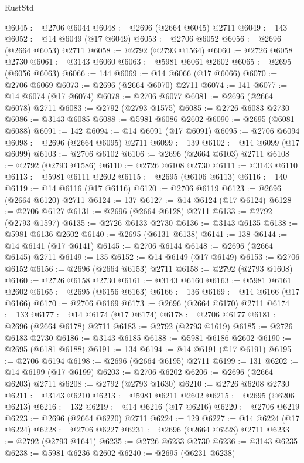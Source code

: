 \begin{lexlean}{RustStd}
\begin{coremodule}
@6045 := @2706 @6044
@6048 := @2696 (@2664 @6045) @2711
@6049 := 143
@6052 := @14 @6049 (@17 @6049)
@6053 := @2706 @6052
@6056 := @2696 (@2664 @6053) @2711
@6058 := @2792 (@2793 @1564)
@6060 := @2726 @6058 @2730
@6061 := @3143 @6060
@6063 := @5981 @6061 @2602
@6065 := @2695 (@6056 @6063)
@6066 := 144
@6069 := @14 @6066 (@17 @6066)
@6070 := @2706 @6069
@6073 := @2696 (@2664 @6070) @2711
@6074 := 141
@6077 := @14 @6074 (@17 @6074)
@6078 := @2706 @6077
@6081 := @2696 (@2664 @6078) @2711
@6083 := @2792 (@2793 @1575)
@6085 := @2726 @6083 @2730
@6086 := @3143 @6085
@6088 := @5981 @6086 @2602
@6090 := @2695 (@6081 @6088)
@6091 := 142
@6094 := @14 @6091 (@17 @6091)
@6095 := @2706 @6094
@6098 := @2696 (@2664 @6095) @2711
@6099 := 139
@6102 := @14 @6099 (@17 @6099)
@6103 := @2706 @6102
@6106 := @2696 (@2664 @6103) @2711
@6108 := @2792 (@2793 @1586)
@6110 := @2726 @6108 @2730
@6111 := @3143 @6110
@6113 := @5981 @6111 @2602
@6115 := @2695 (@6106 @6113)
@6116 := 140
@6119 := @14 @6116 (@17 @6116)
@6120 := @2706 @6119
@6123 := @2696 (@2664 @6120) @2711
@6124 := 137
@6127 := @14 @6124 (@17 @6124)
@6128 := @2706 @6127
@6131 := @2696 (@2664 @6128) @2711
@6133 := @2792 (@2793 @1597)
@6135 := @2726 @6133 @2730
@6136 := @3143 @6135
@6138 := @5981 @6136 @2602
@6140 := @2695 (@6131 @6138)
@6141 := 138
@6144 := @14 @6141 (@17 @6141)
@6145 := @2706 @6144
@6148 := @2696 (@2664 @6145) @2711
@6149 := 135
@6152 := @14 @6149 (@17 @6149)
@6153 := @2706 @6152
@6156 := @2696 (@2664 @6153) @2711
@6158 := @2792 (@2793 @1608)
@6160 := @2726 @6158 @2730
@6161 := @3143 @6160
@6163 := @5981 @6161 @2602
@6165 := @2695 (@6156 @6163)
@6166 := 136
@6169 := @14 @6166 (@17 @6166)
@6170 := @2706 @6169
@6173 := @2696 (@2664 @6170) @2711
@6174 := 133
@6177 := @14 @6174 (@17 @6174)
@6178 := @2706 @6177
@6181 := @2696 (@2664 @6178) @2711
@6183 := @2792 (@2793 @1619)
@6185 := @2726 @6183 @2730
@6186 := @3143 @6185
@6188 := @5981 @6186 @2602
@6190 := @2695 (@6181 @6188)
@6191 := 134
@6194 := @14 @6191 (@17 @6191)
@6195 := @2706 @6194
@6198 := @2696 (@2664 @6195) @2711
@6199 := 131
@6202 := @14 @6199 (@17 @6199)
@6203 := @2706 @6202
@6206 := @2696 (@2664 @6203) @2711
@6208 := @2792 (@2793 @1630)
@6210 := @2726 @6208 @2730
@6211 := @3143 @6210
@6213 := @5981 @6211 @2602
@6215 := @2695 (@6206 @6213)
@6216 := 132
@6219 := @14 @6216 (@17 @6216)
@6220 := @2706 @6219
@6223 := @2696 (@2664 @6220) @2711
@6224 := 129
@6227 := @14 @6224 (@17 @6224)
@6228 := @2706 @6227
@6231 := @2696 (@2664 @6228) @2711
@6233 := @2792 (@2793 @1641)
@6235 := @2726 @6233 @2730
@6236 := @3143 @6235
@6238 := @5981 @6236 @2602
@6240 := @2695 (@6231 @6238)

\end{coremodule}
\end{lexlean}
